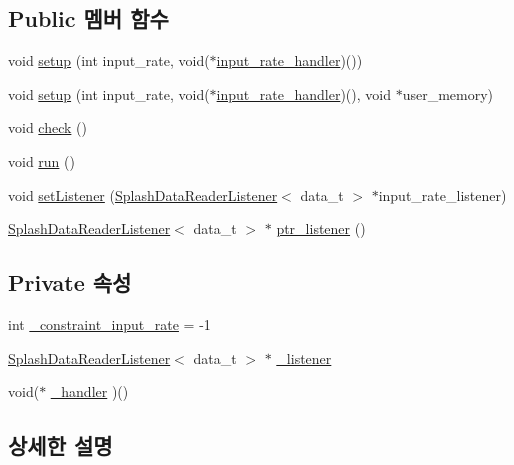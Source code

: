 \subsection*{Public 멤버 함수}
\begin{DoxyCompactItemize}
\item 
void \hyperlink{classInputRateMonitor__Fac_a86fbd0921196702c3be28f817a3a0f97}{setup} (int input\+\_\+rate, void($\ast$\hyperlink{sample__main_8cpp_a57c221f281c346c72b89c10137fea994}{input\+\_\+rate\+\_\+handler})())
\item 
void \hyperlink{classInputRateMonitor__Fac_afced13486e1a312384898c7754063ff9}{setup} (int input\+\_\+rate, void($\ast$\hyperlink{sample__main_8cpp_a57c221f281c346c72b89c10137fea994}{input\+\_\+rate\+\_\+handler})(), void $\ast$user\+\_\+memory)
\item 
void \hyperlink{classInputRateMonitor__Fac_ae65b1007330c762d4df9e3b2751feed8}{check} ()
\item 
void \hyperlink{classInputRateMonitor__Fac_acf625ccd37afd9ad5c5728cc2c6873ce}{run} ()
\item 
void \hyperlink{classInputRateMonitor__Fac_ac5cd52f4b0a79964d61b93c30812912a}{set\+Listener} (\hyperlink{classSplashDataReaderListener}{Splash\+Data\+Reader\+Listener}$<$ data\+\_\+t $>$ $\ast$input\+\_\+rate\+\_\+listener)
\item 
\hyperlink{classSplashDataReaderListener}{Splash\+Data\+Reader\+Listener}$<$ data\+\_\+t $>$ $\ast$ \hyperlink{classInputRateMonitor__Fac_a1e515bd1ac53e333e6c2c1f34741d348}{ptr\+\_\+listener} ()
\end{DoxyCompactItemize}
\subsection*{Private 속성}
\begin{DoxyCompactItemize}
\item 
int \hyperlink{classInputRateMonitor__Fac_a9d144656510782c1ff3d34714b5fff0d}{\+\_\+constraint\+\_\+input\+\_\+rate} = -\/1
\item 
\hyperlink{classSplashDataReaderListener}{Splash\+Data\+Reader\+Listener}$<$ data\+\_\+t $>$ $\ast$ \hyperlink{classInputRateMonitor__Fac_a9dd55c51ebb699228894bfae73ba61c7}{\+\_\+listener}
\item 
void($\ast$ \hyperlink{classInputRateMonitor__Fac_af4e49691b122c46ce77d50ed6f34c477}{\+\_\+handler} )()
\end{DoxyCompactItemize}


\subsection{상세한 설명}
